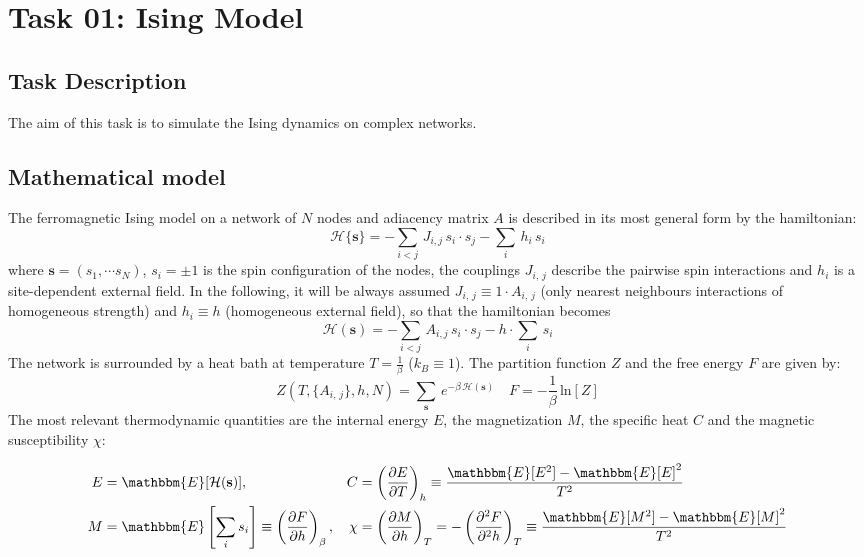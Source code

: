 \chapter{Task 01: Ising Model}
\section{Task Description}
The aim of this task is to simulate the Ising dynamics on complex networks.
\section{Mathematical model}
The ferromagnetic Ising model on a network of $N$ nodes and adiacency matrix $A$ is described in its most general form by the hamiltonian:
\begin{equation*}
    \mathcal{H}\{\mathbf{s}\} = - \sum_{i < j}\, J_{i,j}\,s_i\cdot s_j - \sum_{i}\, h_i\,s_i
\end{equation*}
where $\mathbf{s} = (s_1, \cdots s_N)$, $s_i = \pm 1$ is the spin configuration of the nodes, the couplings $J_{i,\,j}$ describe the pairwise spin interactions and $h_i$ is a site-dependent external field.
In the following, it will be always assumed $J_{i,\,j} \equiv 1\cdot A_{i,\,j}$ (only nearest neighbours interactions of homogeneous strength) and $h_i \equiv h$ (homogeneous external field), so that the hamiltonian becomes
\begin{equation}
        \mathcal{H}(\mathbf{s}) = - \sum_{i < j}\, A_{i,j}\,s_i\cdot s_j - h\cdot \sum_{i}\,s_i
\end{equation}
The network is surrounded by a heat bath at temperature $T = \frac{1}{\beta} $ ($k_B \equiv 1$). The partition function $Z$ and the free energy $F$ are given by:
\begin{equation*}
    Z\left(T, \{A_{i,\,j}\}, h, N\right) = \sum_{\mathbf{s}}\, e^{-\beta\, \mathcal{H}(\mathbf{s})} \quad F = -\frac{1}{\beta}\, \text{ln}[Z]
\end{equation*}
The most relevant thermodynamic quantities are the internal energy $E$, the magnetization $M$, the specific heat $C$ and the magnetic susceptibility $\chi$:

\begin{align*}
E &= \mathbbm{E}[\mathcal{H}(\mathbf{s})], &
C &= \left( \frac{\partial E}{\partial T} \right)_{h} \equiv \frac{\mathbbm{E}[E^2] - \mathbbm{E}[E]^2}{T^2} \\
M &= \mathbbm{E}\left[\sum_{i} s_i \right] \equiv \left( \frac{\partial F}{\partial h} \right)_{\beta}, &
\chi &= \left( \frac{\partial M}{\partial h} \right)_{T} = -\left( \frac{\partial^2 F}{\partial^2 h} \right)_{T} \equiv \frac{\mathbbm{E}[M^2] - \mathbbm{E}[M]^2}{T^2}
\end{align*}


